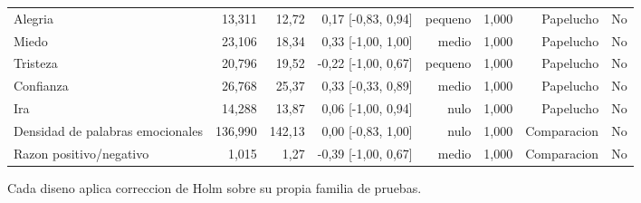 \begin{table}[htbp]
\begin{tabular}{lrrrrrrr}
Alegria & 13,311 & 12,72 & 0,17 [-0,83, 0,94] & pequeno & 1,000 & Papelucho & No \\
Miedo & 23,106 & 18,34 & 0,33 [-1,00, 1,00] & medio & 1,000 & Papelucho & No \\
Tristeza & 20,796 & 19,52 & -0,22 [-1,00, 0,67] & pequeno & 1,000 & Papelucho & No \\
Confianza & 26,768 & 25,37 & 0,33 [-0,33, 0,89] & medio & 1,000 & Papelucho & No \\
Ira & 14,288 & 13,87 & 0,06 [-1,00, 0,94] & nulo & 1,000 & Papelucho & No \\
Densidad de palabras emocionales & 136,990 & 142,13 & 0,00 [-0,83, 1,00] & nulo & 1,000 & Comparacion & No \\
Razon positivo/negativo & 1,015 & 1,27 & -0,39 [-1,00, 0,67] & medio & 1,000 & Comparacion & No \\
\bottomrule
\end{tabular}
\vspace{0.5em}
\begin{minipage}{\linewidth}\footnotesize Cada diseno aplica correccion de Holm sobre su propia familia de pruebas.\end{minipage}
\end{table}

